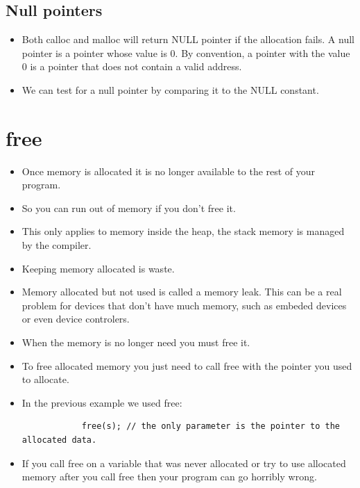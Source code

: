 \subsection{Null pointers}
\begin{itemize}
    \item Both calloc and malloc will return NULL pointer if the allocation fails. A null pointer is a pointer whose value is 0. By convention, a pointer with the value 0 is a pointer that does not contain a valid address.
    \item We can test for a null pointer by comparing it to the NULL constant.
\end{itemize}

\section{free}
\begin{itemize}
    \item Once memory is allocated it is no longer available to the rest of your program. 
    \item So you can run out of memory if you don't free it.
    \item This only applies to memory inside the heap, the stack memory is managed by the compiler.
    \item Keeping memory allocated is waste. 
    \item Memory allocated but not used is called a memory leak. This can be a real problem for devices that don't have much memory, such as embeded devices or even device controlers.
    \item When the memory is no longer need you must free it. 
    \item To free allocated memory you just need to call free with the pointer you used to allocate.
    \item In the previous example we used free:
        \begin{verbatim}
            free(s); // the only parameter is the pointer to the allocated data.
        \end{verbatim}
    
    \item If you call free on a variable that was never allocated or try to use allocated memory after you call free then your program can go horribly wrong.
\end{itemize}

